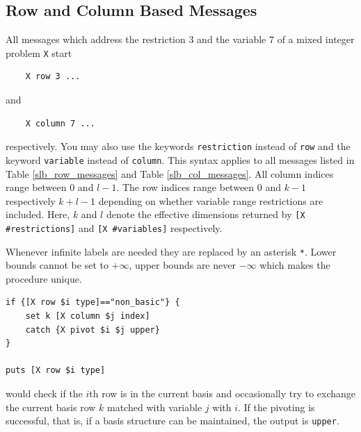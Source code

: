 \documentclass[a4paper,11pt,twoside]{book}
\begin{document}
\bigskip
\subsection{Row and Column Based Messages}

All messages which address the restriction $3$ and the variable $7$ of a
mixed integer problem \verb/X/ start
\begin{verbatim}
    X row 3 ...
\end{verbatim}
and
\begin{verbatim}
    X column 7 ...
\end{verbatim}
respectively. You may also use the keywords \verb/restriction/ instead of
\verb/row/ and the keyword \verb/variable/ instead of \verb/column/.
This syntax applies to all messages listed in Table \ref{slb_row_messages}
and Table \ref{slb_col_messages}. All column indices range between $0$ and
$l-1$. The row indices range between $0$ and $k-1$ respectively $k+l-1$
depending on whether variable range restrictions are included. Here, $k$ and
$l$ denote the effective dimensions returned by \verb/[X #restrictions]/ and
\verb/[X #variables]/ respectively.

Whenever infinite labels are needed they are replaced by an asterisk \verb/*/.
Lower bounds cannot be set to $+\infty$, upper bounds are never $-\infty$ which
makes the procedure unique.
\begin{mysample}
\begin{verbatim}
if {[X row $i type]=="non_basic"} {
    set k [X column $j index]
    catch {X pivot $i $j upper}
}

puts [X row $i type]
\end{verbatim}
\end{mysample}
would check if the $i$th row is in the current basis and occasionally try to
exchange the current basis row $k$ matched with variable $j$ with $i$. If the
pivoting is successful, that is, if a basis structure can be maintained,
the output is \verb/upper/.


\bigskip
\end{document}
